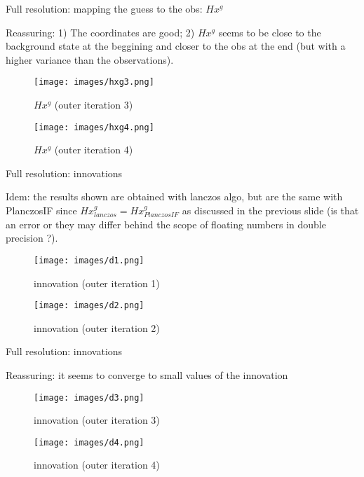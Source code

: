 \documentclass[francais]{beamer}
\begin{document}
\begin{frame}{Full resolution: mapping the guess to the obs: $H x^g$}
\begin{center}
Reassuring: 1) The coordinates are good; 2) $Hx^g$ seems to be close to the background state at the beggining and closer to the obs at the end (but with a higher variance than the observations). 
\begin{figure}
  \texttt{[image: images/hxg3.png]}
  \caption{$H x^g$ (outer iteration 3)}
\endminipage \hfill
{}%
  \texttt{[image: images/hxg4.png]}
  \caption{$H x^g$ (outer iteration 4)}
\endminipage
\end{figure}
\end{center}
\end{frame}

\begin{frame}{Full resolution: innovations}
\begin{center}
Idem: the results shown are obtained with lanczos algo, but are the same with PlanczosIF since $Hx^g_{lanczos}=Hx^g_{PlanczosIF}$ as discussed in the previous slide (is that an error or they may differ behind the scope of floating numbers in double precision ?).
\begin{figure}
  \texttt{[image: images/d1.png]}
  \caption{innovation (outer iteration 1)}
\endminipage\hfill
{}
  \texttt{[image: images/d2.png]}
  \caption{innovation (outer iteration 2)}
\endminipage
\end{figure}
\end{center}
\end{frame}

\begin{frame}{Full resolution: innovations}
\begin{center}
Reassuring: it seems to converge to small values of the innovation
\begin{figure}
  \texttt{[image: images/d3.png]}
  \caption{innovation (outer iteration 3)}
\endminipage \hfill
{}%
  \texttt{[image: images/d4.png]}
  \caption{innovation (outer iteration 4)}
\endminipage
\end{figure}
\end{center}
\end{frame}
\end{document}
